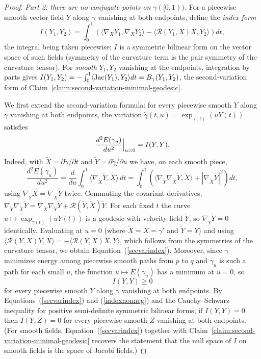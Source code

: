 \begin{proof}
\emph{Part 2: there are no conjugate points on $\gamma([0,1))$.}
For a piecewise smooth vector field $Y$ along $\gamma$ vanishing at
both endpoints, define the \emph{index form}
$$I(Y_1,Y_2)=\int_0^1\left(\langle\nabla_XY_1,\nabla_XY_2\rangle
-\langle{\mathcal R}(Y_1,X)X,Y_2\rangle\right)dt,$$
the integral being taken piecewise; $I$ is a symmetric bilinear form
on the vector space of such fields (symmetry of the curvature term
is the pair symmetry of the curvature tensor). For \emph{smooth}
$Y_1,Y_2$ vanishing at the endpoints, integration by parts gives
$I(Y_1,Y_2)=-\int_0^1\langle \operatorname{Jac}(Y_1),Y_2\rangle
dt=B_\gamma(Y_1,Y_2)$, the second-variation form of
Claim~\ref{claim:second-variation-minimal-geodesic}.

We first extend the second-variation formula: for every piecewise
smooth $Y$ along $\gamma$ vanishing at both endpoints, the variation
$\tilde\gamma(t,u)=\exp_{\gamma(t)}(uY(t))$ satisfies
\begin{equation}\label{secvarindex}
\frac{d^2E(\gamma_u)}{du^2}\Bigl|_{u=0}\Bigr.=I(Y,Y).
\end{equation}
Indeed, with $\widetilde X=\partial\tilde\gamma/\partial t$ and
$\widetilde Y=\partial\tilde\gamma/\partial u$ we have, on each
smooth piece,
$$\frac{d^2E(\gamma_u)}{du^2}
=\frac{d}{du}\int_0^1\langle\nabla_{\widetilde X}\widetilde
Y,\widetilde X\rangle\,dt
=\int_0^1\left(\langle\nabla_{\widetilde Y}\nabla_{\widetilde
X}\widetilde Y,\widetilde X\rangle
+|\nabla_{\widetilde X}\widetilde Y|^2\right)dt,$$
using $\nabla_{\widetilde Y}\widetilde X=\nabla_{\widetilde
X}\widetilde Y$ twice. Commuting the covariant derivatives,
$\nabla_{\widetilde Y}\nabla_{\widetilde X}\widetilde
Y=\nabla_{\widetilde X}\nabla_{\widetilde Y}\widetilde Y+{\mathcal
R}(\widetilde Y,\widetilde X)\widetilde Y$. For each fixed $t$ the
curve $u\mapsto\exp_{\gamma(t)}(uY(t))$ is a geodesic with velocity
field $\widetilde Y$, so $\nabla_{\widetilde Y}\widetilde Y=0$
identically. Evaluating at $u=0$ (where $\widetilde X=X=\gamma'$ and
$\widetilde Y=Y$) and using
$\langle{\mathcal R}(Y,X)Y,X\rangle=-\langle{\mathcal
R}(Y,X)X,Y\rangle$, which follows from the symmetries of the
curvature tensor, we obtain
Equation~(\ref{secvarindex}). Moreover, since $\gamma$ minimizes
energy among piecewise smooth paths from $p$ to $q$ and
$\gamma_u$ is such a path for each small $u$, the function
$u\mapsto E(\gamma_u)$ has a minimum at $u=0$, so
\begin{equation}\label{indexnonneg}
I(Y,Y)\ge 0
\end{equation}
for every piecewise smooth $Y$ along $\gamma$ vanishing at both
endpoints. By Equations~(\ref{secvarindex}) and
(\ref{indexnonneg}) and the Cauchy--Schwarz inequality for
positive semi-definite symmetric bilinear forms, if $I(Y,Y)=0$ then
$I(Y,Z)=0$ for every piecewise smooth $Z$ vanishing at both
endpoints. (For smooth fields, Equation~(\ref{secvarindex})
together with
Claim~\ref{claim:second-variation-minimal-geodesic} recovers the
statement that the null space of $I$ on smooth fields is the space
of Jacobi fields.)


\end{proof}
